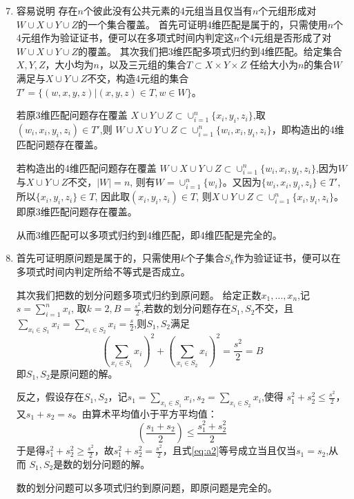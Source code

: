 \documentclass[a4paper]{article}
\begin{document}
\begin{enumerate}[label=\arabic*.]
  \setcounter{enumi}{6}
    \item 容易说明 存在$n$个彼此没有公共元素的4元组当且仅当有$n$个元组形成对$W\cup X \cup Y \cup Z $的一个集合覆盖。
    首先可证明4维匹配是属于\NP 的，只需使用$n$个4元组作为验证证书，便可以在多项式时间内判定这$n$个4元组是否形成了对
    $W\cup X \cup Y \cup Z $的覆盖。
    其次我们把3维匹配多项式归约到4维匹配。给定集合$X,Y,Z$，大小均为$n$，以及三元组的集合$T\subset X \times Y \times Z$
    任给大小为$n$的集合$W$满足与$X\cup Y\cup Z$不交，构造4元组的集合$T'=\{(w,x,y,z)|(x,y,z)\in T,w\in W\}$。
    
    若原3维匹配问题存在覆盖
    $X\cup Y \cup Z \subset \cup_{i=1}^n\{x_i,y_i,z_i\}$,取$(w_i,x_i,y_i,z_i)\in T'$,则
    $W \cup X\cup Y \cup Z \subset \cup_{i=1}^n\{w_i,x_i,y_i,z_i\}$，即构造出的4维匹配问题存在覆盖。

    若构造出的4维匹配问题存在覆盖
    $W \cup X\cup Y \cup Z \subset \cup_{i=1}^n\{w_i,x_i,y_i,z_i\}$,因为$W$与$X\cup Y\cup Z$不交，$|W|=n$,
    则有$W=\cup_{i=1}^n\{w_i\}$。又因为$\{w_i,x_i,y_i,z_i\}\in T'$,所以$\{x_i,y_i,z_i\}\in T$,
    因此取$(x_i,y_i,z_i)\in T$,
    则$X\cup Y \cup Z \subset \cup_{i=1}^n\{x_i,y_i,z_i\}$。    
    即原3维匹配问题存在覆盖。

    从而3维匹配可以多项式归约到4维匹配，即4维匹配是\NP 完全的。
    
  \setcounter{enumi}{26}
    \item 
    首先可证明原问题是属于\NP 的，只需使用$k$个子集合$S_k$作为验证证书，便可以在多项式时间内判定所给不等式是否成立。
    
    其次我们把数的划分问题多项式归约到原问题。
    给定正数$x_1,\dots,x_n$,记$s=\sum_{i=1}^n x_i$,
    取$k=2,B=\frac{s^2}{2}$,若数的划分问题存在$S_1,S_2$不交，且
    $\sum_{x_i\in S_1}x_i=\sum_{x_i\in S_2}x_i=\frac{s}{2}$,则$S_1,S_2$满足
    \begin{equation}
        (\sum_{x_i\in S_1}x_i)^2+(\sum_{x_i\in S_2}x_i)^2=\frac{s^2}{2}=B
    \end{equation}
    即$S_1,S_2$是原问题的解。
    
    反之，假设存在$S_1,S_2$，记$s_1=\sum_{x_i\in S_1}x_i,s_2=\sum_{x_i\in S_2}x_i$,使得
    $s_1^2+s_2^2\leq \frac{s^2}{2}$，又$s_1+s_2=s$。由算术平均值小于平方平均值：
    \begin{equation}\label{eq:a2}
        \left(\frac{s_1+s_2}{2}\right)\leq \frac{s_1^2+s_2^2}{2}
    \end{equation}
    于是得$s_1^2+s_2^2\geq \frac{s^2}{2}$，故$s_1^2+s_2^2= \frac{s^2}{2}$，且式\eqref{eq:a2}等号成立当且仅当$s_1=s_2$,从而
    $S_1,S_2$是数的划分问题的解。
    
    数的划分问题可以多项式归约到原问题，即原问题是\NP 完全的。
    
  \end{enumerate}
\end{document}
